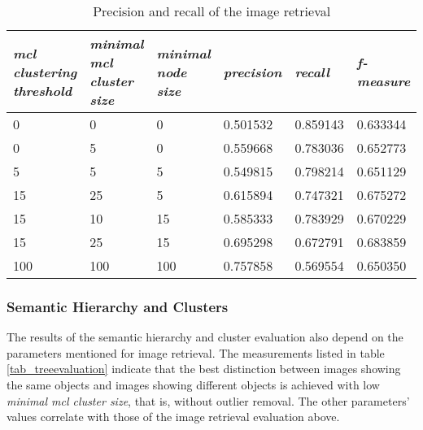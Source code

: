 \begin{table}[h]
   \begin{tabular}{| p{2.2cm}| p{2.2cm}| p{2cm} || p{2cm} | p{2cm} | p{2cm} |}
    \hline
    \emph{mcl clustering threshold} & \emph{minimal mcl cluster size} & \emph{minimal node size} & \emph{precision} & \emph{recall} & \emph{f-measure} \\ \hline
    0 	& 0 	& 0 & 0.501532 & 0.859143 & 0.633344 \\ \hline
    0 	& 5 	& 0 & 0.559668 & 0.783036 & 0.652773 \\ \hline
    5 	& 5 	& 5 & 0.549815 & 0.798214 & 0.651129 \\ \hline     
    15 	& 25 &  5 & 0.615894 & 0.747321 & 0.675272 \\ \hline
    15 	& 10 & 15 & 0.585333 & 0.783929 & 0.670229 \\ \hline
    15 	& 25 & 15 & 0.695298 & 0.672791 & 0.683859 \\ \hline
    	100 	& 100 & 100 & 0.757858 & 0.569554 & 0.650350 \\ \hline
    \end{tabular}
    \caption{Precision and recall of the image retrieval}
	\label{tab_retrievalevaluation}
\end{table}


\subsubsection*{Semantic Hierarchy and Clusters}

The results of the semantic hierarchy and cluster evaluation also depend on the parameters mentioned for image retrieval. The measurements listed in table \ref{tab_treeevaluation} indicate that the best distinction between images showing the same objects and images showing different objects is achieved with low \emph{minimal mcl cluster size}, that is, without outlier removal. The other parameters' values correlate with those of the image retrieval evaluation above.\\


